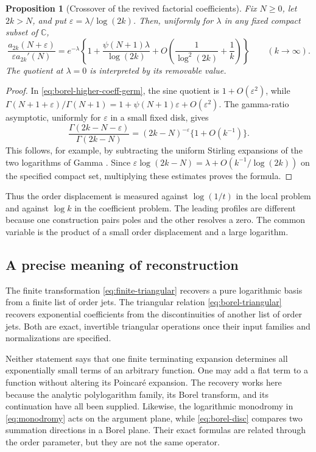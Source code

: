 \documentclass[11pt,a4paper]{article}
\numberwithin{equation}{section}
\newtheorem{proposition}[theorem]{Proposition}
\theoremstyle{definition}
\theoremstyle{remark}
\newcommand{\C}{\mathbb C}
\newcommand{\eps}{\varepsilon}
\begin{document}
\begin{proposition}[Crossover of the revived factorial coefficients]
\label{prop:coefficient-crossover}
Fix $N\ge0$, let $2k>N$, and put $\eps=\lambda/\log(2k)$.
Then, uniformly for $\lambda$ in any fixed compact subset of $\C$,
\begin{equation}\label{eq:coefficient-crossover}
 \frac{a_{2k}(N+\eps)}{\eps a_{2k}'(N)}
 =e^{-\lambda}
 \left\{1+\frac{\psi(N+1)\lambda}{\log(2k)}
             +O\!\left(\frac1{\log^2(2k)}+\frac1k\right)\right\}
 \qquad(k\to\infty).
\end{equation}
The quotient at $\lambda=0$ is interpreted by its removable value.
\end{proposition}
\begin{proof}
In \eqref{eq:borel-higher-coeff-germ}, the sine quotient is
$1+O(\eps^2)$, while
$\Gamma(N+1+\eps)/\Gamma(N+1)
=1+\psi(N+1)\eps+O(\eps^2)$.
The gamma-ratio asymptotic, uniformly for $\eps$ in a small fixed
disk, gives
\[
 \frac{\Gamma(2k-N-\eps)}{\Gamma(2k-N)}
 =(2k-N)^{-\eps}\{1+O(k^{-1})\}.
\]
This follows, for example, by subtracting the uniform Stirling
expansions of the two logarithms of Gamma
\cite{dlmf-gamma}. Since
$\eps\log(2k-N)=\lambda+O(k^{-1}/\log(2k))$ on the specified compact
set, multiplying these estimates proves the formula.
\end{proof}

Thus the order displacement is measured against $\log(1/t)$ in the
local problem and against $\log k$ in the coefficient problem.
The leading profiles are different because one construction pairs
poles and the other resolves a zero. The common variable is the
product of a small order displacement and a large logarithm.

\subsection{A precise meaning of reconstruction}

The finite transformation \eqref{eq:finite-triangular} recovers a
pure logarithmic basis from a finite list of order jets. The
triangular relation \eqref{eq:borel-triangular} recovers exponential
coefficients from the discontinuities of another list of order jets.
Both are exact, invertible triangular operations once their input
families and normalizations are specified.

Neither statement says that one finite terminating expansion determines
all exponentially small terms of an arbitrary function. One may add a
flat term to a function without altering its Poincar\'e expansion.
The recovery works here because the analytic polylogarithm family,
its Borel transform, and its continuation have all been supplied.
Likewise, the logarithmic monodromy in \eqref{eq:monodromy} acts on
the argument plane, while \eqref{eq:borel-disc} compares two summation
directions in a Borel plane. Their exact formulas are related through
the order parameter, but they are not the same operator.
\end{document}

